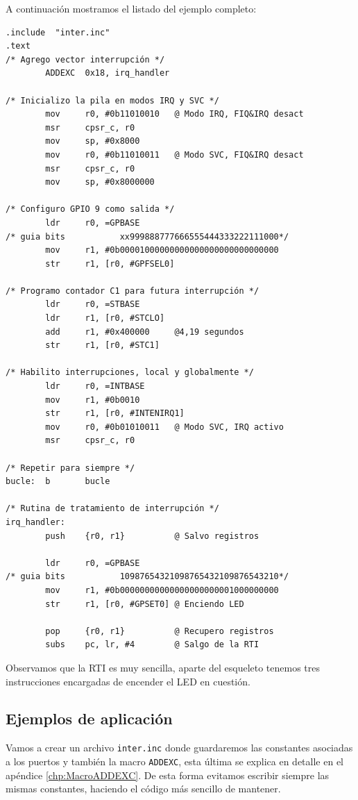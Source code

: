 A continuación mostramos el listado del ejemplo completo:

\newpage
\begin{lstlisting}[caption={inter1.s},label={lst:codigoPract5_1}]
        .include  "inter.inc"
.text
/* Agrego vector interrupción */
        ADDEXC  0x18, irq_handler

/* Inicializo la pila en modos IRQ y SVC */
        mov     r0, #0b11010010   @ Modo IRQ, FIQ&IRQ desact
        msr     cpsr_c, r0
        mov     sp, #0x8000
        mov     r0, #0b11010011   @ Modo SVC, FIQ&IRQ desact
        msr     cpsr_c, r0
        mov     sp, #0x8000000

/* Configuro GPIO 9 como salida */
        ldr     r0, =GPBASE
/* guia bits           xx999888777666555444333222111000*/
        mov     r1, #0b00001000000000000000000000000000
        str     r1, [r0, #GPFSEL0]

/* Programo contador C1 para futura interrupción */
        ldr     r0, =STBASE
        ldr     r1, [r0, #STCLO]
        add     r1, #0x400000     @4,19 segundos
        str     r1, [r0, #STC1]

/* Habilito interrupciones, local y globalmente */
        ldr     r0, =INTBASE
        mov     r1, #0b0010
        str     r1, [r0, #INTENIRQ1]
        mov     r0, #0b01010011   @ Modo SVC, IRQ activo
        msr     cpsr_c, r0

/* Repetir para siempre */
bucle:  b       bucle

/* Rutina de tratamiento de interrupción */
irq_handler:
        push    {r0, r1}          @ Salvo registros

        ldr     r0, =GPBASE
/* guia bits           10987654321098765432109876543210*/
        mov     r1, #0b00000000000000000000001000000000
        str     r1, [r0, #GPSET0] @ Enciendo LED

        pop     {r0, r1}          @ Recupero registros
        subs    pc, lr, #4        @ Salgo de la RTI
\end{lstlisting}

Observamos que la RTI es muy sencilla, aparte del esqueleto tenemos tres instrucciones
encargadas de encender el LED en cuestión.

\subsection{Ejemplos de aplicación}

Vamos a crear un archivo {\tt inter.inc} donde guardaremos las constantes
asociadas a los puertos y también la macro {\tt ADDEXC}, esta última
se explica en detalle en el apéndice \ref{chp:MacroADDEXC}. De esta forma evitamos escribir
siempre las mismas constantes, haciendo el código más sencillo de mantener.

